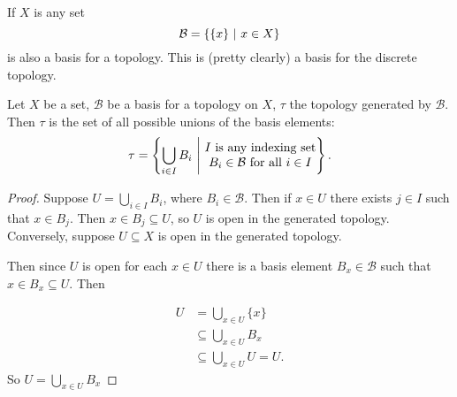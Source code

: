 \documentclass[12pt, twosided]{article}
\begin{document}
\begin{exa}
  If \(X\) is any set \[\mathcal{B} = \left\{ \left\{ x \right\}\ \middle\vert\  x \in X \right\}\] is also a basis for a topology. This is (pretty clearly) a basis for the discrete topology.
\end{exa}

\begin{lm}
  Let \(X\) be a set, \(\mathcal{B}\) be a basis for a topology on \(X\), \(\tau\) the topology generated by \(\mathcal{B}\). Then \(\tau\) is the set of all possible unions of the basis elements:
  \begin{align*}
    \tau = \left\{ \bigcup_{i \in I} B_i\ \middle\vert\  \begin{matrix} I \text{ is any indexing set} \\ B_i \in \mathcal{B} \text{ for all } i \in I \end{matrix} \right\}.
  \end{align*}
\end{lm}
\begin{proof}
  Suppose \(U = \bigcup_{i \in I} B_i\), where \(B_i \in \mathcal{B}\). Then if \(x \in U\) there exists \(j \in I\) such that \(x \in B_j\). Then \(x \in B_j \subseteq U\), so \(U\) is open in the generated topology. Conversely, suppose \(U \subseteq X\) is open in the generated topology.

  Then since \(U\) is open for each \(x \in U\) there is a basis element \(B_x \in \mathcal{B}\) such that \(x \in B_x \subseteq U\). Then

  \begin{align*}
    U &= \bigcup_{x \in U} \{x\} \\
      &\subseteq \bigcup_{x \in U} B_x \\
      &\subseteq \bigcup_{x \in U} U = U.
  \end{align*}
  So \(U = \bigcup_{x \in U} B_x\)
\end{proof}
\end{document}
